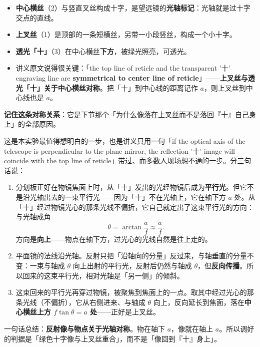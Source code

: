 \documentclass[11pt]{ctexart}
\begin{document}
\begin{itemize}
\item \textbf{中心横丝}（2）与竖直叉丝构成十字，是望远镜的\textbf{光轴标记}：光轴就是过十字交点的直线。
\item \textbf{上叉丝}（1）是顶部的一条短横丝，另带一小段竖丝，构成一个小十字。
\item \textbf{透光「十」}（3）在中心横丝\textbf{下方}，被绿光照亮，可透光。
\item 讲义原文说得很关键：「the top line of reticle and the transparent '十' engraving line are \textbf{symmetrical to center line of reticle}」——\textbf{上叉丝与透光「十」关于中心横丝对称}。把「十」到中心线的距离记作 $a$，则上叉丝到中心线也是 $a$。
\end{itemize}

\textbf{记住这条对称关系}：它是下节那个「为什么像落在上叉丝而不是落回『十』自己身上」的全部原因。


这是本实验最值得想明白的一步，也是讲义只用一句「if the optical axis of the telescope is perpendicular to the plane mirror, the reflection '十' image will coincide with the top line of reticle」带过、而多数人现场想不通的一步。分三句话说：

\begin{enumerate}[label=\textbf{(\arabic*)}]
\item 分划板正好在物镜焦面上时，从「十」发出的光经物镜后成为\textbf{平行光}。但它不是沿光轴出去的一束平行光——因为「十」不在光轴上，它在轴下方 $a$ 处。从「十」经过物镜光心的那条光线不偏折，它自己就定出了这束平行光的方向：与光轴成角
\[
\theta=\arctan\frac{a}{f}\approx\frac{a}{f}.
\]
方向是\textbf{向上}——物点在轴下方，过光心的光线自然是往上走的。

\item 平面镜的法线沿光轴。反射只把「沿轴向的分量」反过来，与轴垂直的分量不变：一束与轴成 $\theta$ 向上出射的平行光，反射后仍然与轴成 $\theta$，但\textbf{反向传播}。所以回来的这束平行光，相对光轴是「另一侧」的倾斜。

\item 这束回来的平行光再穿过物镜，被聚焦到焦面上的一点。取其中经过光心的那条光线（不偏折），它从右侧进来、与轴成 $\theta$ 向上，反向延长到焦面，落在\textbf{中心横丝上方 $f\tan\theta=a$ 处}——正好是上叉丝。
\end{enumerate}

一句话总结：\textbf{反射像与物点关于光轴对称}。物在轴下 $a$，像就在轴上 $a$。所以调好的判据是「绿色十字像与上叉丝重合」，而不是「像回到『十』身上」。
\end{document}
